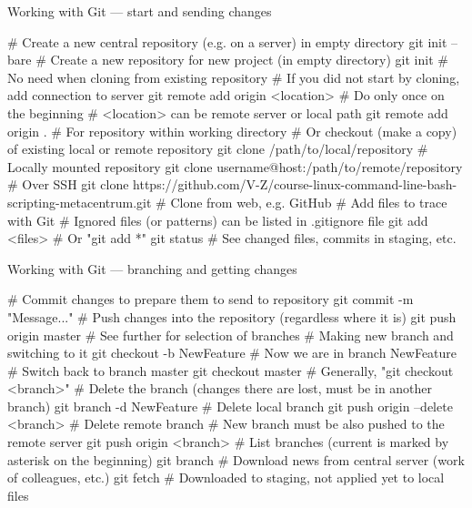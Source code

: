\documentclass[compress, ucs, xelatex, 11pt, xcolor=svgnames, aspectratio=169,
	hyperref={
		bookmarks=true,
		unicode=true,
		colorlinks=true,
		pdftitle={Linux, command line and MetaCentrum},
		plainpages=false,
		pdfauthor={Vojtech Zeisek},
		pdfsubject={Course about use of Linux command line, writing shell scripts and using MetaCentrum of CESNET},
		pdfcreator={XeLaTeX},
		pdfkeywords={Linux, GNU, BASH, shell, command line, MetaCentrum},
		linkcolor=DarkRed, %
		anchorcolor=DarkBlue, %
		citecolor=Indigo, %
		filecolor=NavyBlue, %
		menucolor=DarkMagenta, %
		urlcolor=DarkBlue, %
		pdftex},
	url={hyphens, lowtilde} %
	]{beamer}
\begin{document}
\begin{frame}[fragile]{Working with Git --- start and sending changes}
	\begin{bashcode}
    # Create a new central repository (e.g. on a server) in empty directory
    git init --bare
    # Create a new repository for new project (in empty directory)
    git init # No need when cloning from existing repository
    # If you did not start by cloning, add connection to server
    git remote add origin <location> # Do only once on the beginning
    # <location> can be remote server or local path
    git remote add origin . # For repository within working directory
    # Or checkout (make a copy) of existing local or remote repository
    git clone /path/to/local/repository # Locally mounted repository
    git clone username@host:/path/to/remote/repository # Over SSH
    git clone https://github.com/V-Z/course-linux-command-line-bash-
      scripting-metacentrum.git # Clone from web, e.g. GitHub
    # Add files to trace with Git
    # Ignored files (or patterns) can be listed in .gitignore file
    git add <files> # Or "git add *"
    git status # See changed files, commits in staging, etc.
	\end{bashcode}
\end{frame}

\begin{frame}[fragile]{Working with Git --- branching and getting changes}
	\begin{bashcode}
    # Commit changes to prepare them to send to repository
    git commit -m "Message..."
    # Push changes into the repository (regardless where it is)
    git push origin master # See further for selection of branches
    # Making new branch and switching to it
    git checkout -b NewFeature # Now we are in branch NewFeature
    # Switch back to branch master
    git checkout master # Generally, "git checkout <branch>"
    # Delete the branch (changes there are lost, must be in another branch)
    git branch -d NewFeature # Delete local branch
    git push origin --delete <branch> # Delete remote branch
    # New branch must be also pushed to the remote server
    git push origin <branch>
    # List branches (current is marked by asterisk on the beginning)
    git branch
    # Download news from central server (work of colleagues, etc.)
    git fetch # Downloaded to staging, not applied yet to local files
	\end{bashcode}
\end{frame}
\end{document}
